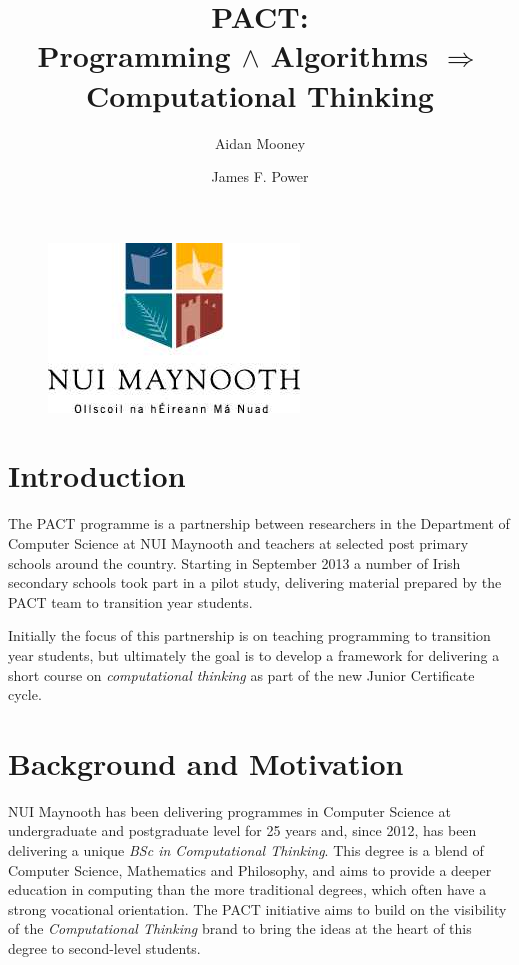 \documentclass[a4paper]{article}
\begin{document}
\title{PACT: \\ {\large Programming ${\land}$ Algorithms $\Rightarrow$ Computational Thinking}}

\author{Aidan Mooney \and James F. Power}

\begin{figure}\centering
\includegraphics[height=.2\textheight]{nuim_large}
\end{figure}

\maketitle

\section{Introduction}
The PACT programme is a partnership between researchers in the Department of Computer Science at NUI Maynooth and teachers at selected post primary schools around the country.   Starting in September 2013 a number of Irish secondary schools took part in a pilot study, delivering material prepared by the PACT team to transition year students.

Initially the focus of this partnership is on teaching programming to transition year students, but ultimately the goal is to develop a framework for delivering a short course on \textit{computational thinking} as part of the new Junior Certificate cycle.


\section{Background and Motivation}

NUI Maynooth has been delivering programmes in Computer Science at undergraduate and postgraduate level for 25 years and, since 2012, has been delivering a unique \textit{BSc in Computational Thinking}.  This degree is a blend of Computer Science, Mathematics and Philosophy, and aims to provide a deeper education in computing than the more traditional degrees, which often have a strong vocational orientation.  The PACT initiative aims to build on the visibility of the \textit{Computational Thinking} brand to bring the ideas at the heart of this degree to second-level students.
\end{document}
